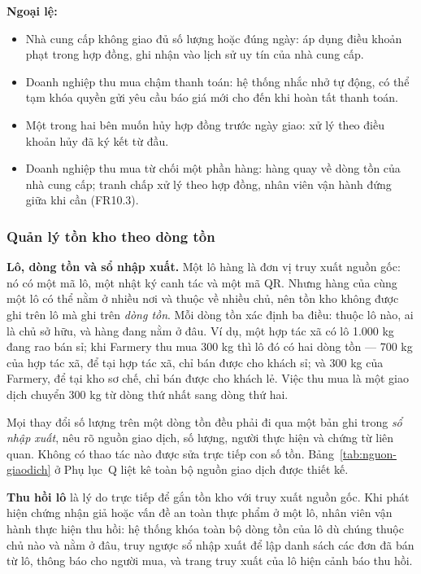 \noindent\textbf{Ngoại lệ:}
\begin{itemize}
    \item Nhà cung cấp không giao đủ số lượng hoặc đúng ngày: áp dụng điều khoản phạt trong hợp đồng, ghi nhận vào lịch sử uy tín của nhà cung cấp.
    \item Doanh nghiệp thu mua chậm thanh toán: hệ thống nhắc nhở tự động, có thể tạm khóa quyền gửi yêu cầu báo giá mới cho đến khi hoàn tất thanh toán.
    \item Một trong hai bên muốn hủy hợp đồng trước ngày giao: xử lý theo điều khoản hủy đã ký kết từ đầu.
    \item Doanh nghiệp thu mua từ chối một phần hàng: hàng quay về dòng tồn của nhà cung cấp; tranh chấp xử lý theo hợp đồng, nhân viên vận hành đứng giữa khi cần (FR10.3).
\end{itemize}

\subsubsection*{Quản lý tồn kho theo dòng tồn}
\noindent\textbf{Lô, dòng tồn và sổ nhập xuất.} Một lô hàng là đơn vị truy xuất nguồn gốc: nó có một mã lô, một nhật ký canh tác và một mã QR. Nhưng hàng của cùng một lô có thể nằm ở nhiều nơi và thuộc về nhiều chủ, nên tồn kho không được ghi trên lô mà ghi trên \emph{dòng tồn}. Mỗi dòng tồn xác định ba điều: thuộc lô nào, ai là chủ sở hữu, và hàng đang nằm ở đâu. Ví dụ, một hợp tác xã có lô 1.000 kg đang rao bán sỉ; khi Farmery thu mua 300 kg thì lô đó có hai dòng tồn --- 700 kg của hợp tác xã, để tại hợp tác xã, chỉ bán được cho khách sỉ; và 300 kg của Farmery, để tại kho sơ chế, chỉ bán được cho khách lẻ. Việc thu mua là một giao dịch chuyển 300 kg từ dòng thứ nhất sang dòng thứ hai.

Mọi thay đổi số lượng trên một dòng tồn đều phải đi qua một bản ghi trong \emph{sổ nhập xuất}, nêu rõ nguồn giao dịch, số lượng, người thực hiện và chứng từ liên quan. Không có thao tác nào được sửa trực tiếp con số tồn. Bảng~\ref{tab:nguon-giaodich} ở Phụ lục~Q liệt kê toàn bộ nguồn giao dịch được thiết kế.

\noindent\textbf{Thu hồi lô} là lý do trực tiếp để gắn tồn kho với truy xuất nguồn gốc. Khi phát hiện chứng nhận giả hoặc vấn đề an toàn thực phẩm ở một lô, nhân viên vận hành thực hiện thu hồi: hệ thống khóa toàn bộ dòng tồn của lô dù chúng thuộc chủ nào và nằm ở đâu, truy ngược sổ nhập xuất để lập danh sách các đơn đã bán từ lô, thông báo cho người mua, và trang truy xuất của lô hiện cảnh báo thu hồi.

